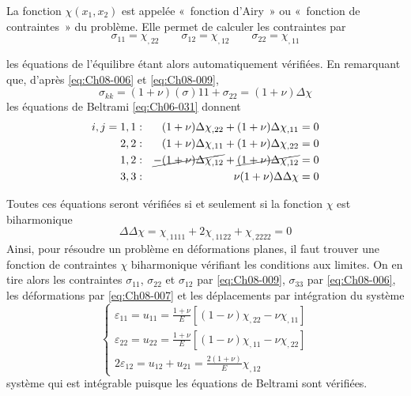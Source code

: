La fonction $\chi(x_1,x_2)$ est appelée «~fonction d'Airy~» ou «~fonction de contraintes~» du problème. 
Elle permet de calculer les contraintes par 
\begin{equation}
\sigma_{11}=\chi_{,22} \qquad \sigma_{12}=\chi_{,12} \qquad \sigma_{22}=\chi_{,11}
    \label{eq:Ch08-009}
\end{equation}

les équations de l'équilibre étant alors automatiquement vérifiées. 
En remarquant que, d'après \eqref{eq:Ch08-006} et \eqref{eq:Ch08-009}, 
\begin{equation}
\sigma_{kk}=(1+\nu)(\sigma){11}+\sigma_{22}=(1+\nu)\Delta\chi
\label{eq:Ch08-010}
\end{equation}
les équations de Beltrami \eqref{eq:Ch06-031} donnent 
\begin{equation}
  \begin{aligned}
  i,j = 1,1 & : &  (1+\nu) \Delta\chi_{,22} + (1+\nu) \Delta\chi_{,11}=0 \\
        2,2 & : &  (1+\nu) \Delta\chi_{,11} + (1+\nu) \Delta\chi_{,22}=0 \\ 
        1,2 & : & \cancel{-(1+\nu) \Delta\chi_{,12}} + \cancel{(1+\nu) \Delta\chi_{,12}}=0 \\
        3,3 & : & \nu(1+\nu) \Delta\Delta\chi = 0 \\
  \end{aligned}
\label{eq:Ch08-011}
\end{equation}

Toutes ces équations seront vérifiées si et seulement si la fonction $\chi$ est biharmonique 
\begin{equation}
\Delta\Delta\chi=\chi_{,1111}+2\chi_{,1122}+\chi_{,2222}=0
\label{eq:Ch08-012}
\end{equation}
Ainsi, pour résoudre un problème en déformations planes, il faut trouver une fonction de contraintes $\chi$ biharmonique vérifiant les conditions aux limites. 
On en tire alors les contraintes $\sigma_{11}$, $\sigma_{22}$ et $\sigma_{12}$ par \eqref{eq:Ch08-009}, $\sigma_{33}$ par \eqref{eq:Ch08-006}, les déformations par \eqref{eq:Ch08-007} et les déplacements par intégration du système 
\begin{equation}
  \left\{
  \begin{aligned}
  \varepsilon_{11}=u_{11}=\frac{1+\nu}{E}[(1-\nu)\chi_{,22}-\nu\chi_{,11}] \\
  \varepsilon_{22}=u_{22}=\frac{1+\nu}{E}[(1-\nu)\chi_{,11}-\nu\chi_{,22}] \\
  2\varepsilon_{12}=u_{12}+u_{21}=\frac{2(1+\nu)}{E}\chi_{,12}
  \end{aligned}
  \right.
\label{eq:Ch08-013}
\end{equation}
système qui est intégrable puisque les équations de Beltrami sont vérifiées. 
